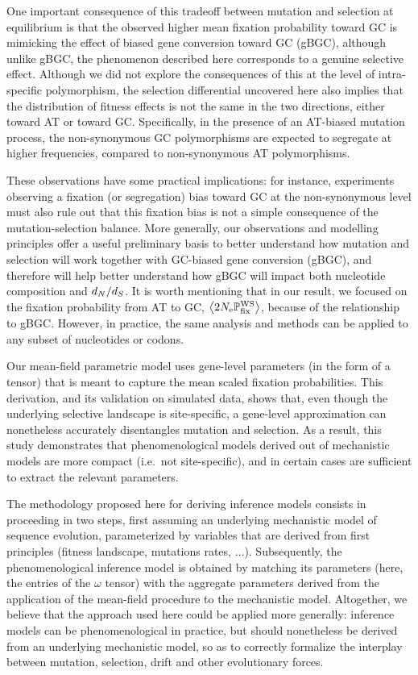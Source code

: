 \documentclass{article}
\begin{document}
One important consequence of this tradeoff between mutation and selection at equilibrium is that the observed higher mean fixation probability toward GC is mimicking the effect of biased gene conversion toward GC ({gBGC}), although unlike {gBGC}, the phenomenon described here corresponds to a genuine selective effect.
Although we did not explore the consequences of this at the level of intra-specific polymorphism, the selection differential uncovered here also implies that the distribution of fitness effects is not the same in the two directions, either toward AT or toward GC.
Specifically, in the presence of an AT-biased mutation process, the {non-synonymous} GC polymorphisms are expected to segregate at higher frequencies, compared to {non-synonymous} AT polymorphisms.

These observations have some practical implications: for instance, experiments observing a fixation (or segregation) bias toward GC at the {non-synonymous} level must also rule out that this fixation bias is not a simple consequence of the mutation-selection balance.
More generally, our observations and modelling principles offer a useful preliminary basis to better understand how mutation and selection will work together with GC-biased gene conversion ({gBGC}), and therefore will help better understand how {gBGC} will impact both nucleotide composition and $d_N / d_S$.
It is worth mentioning that in our result, we focused on the fixation probability from AT to GC, $\left\langle 2 N_{\text{e}} \mathbb{P}_{\text{fix}}^{\text{WS}} \right\rangle$, because of the relationship to {gBGC}.
However, in practice, the same analysis and methods can be applied to any subset of nucleotides or codons.

Our mean-field parametric model uses gene-level parameters (in the form of a tensor) that is meant to capture the mean scaled fixation probabilities.
This derivation, and its validation on simulated data, shows that, even though the underlying selective landscape is site-specific, a gene-level approximation can nonetheless accurately disentangles mutation and selection.
As a result, this study demonstrates that phenomenological models derived out of mechanistic models are more compact (i.e.~not site-specific), and in certain cases are sufficient to extract the relevant parameters.

The methodology proposed here for deriving inference models consists in proceeding in two steps, first assuming an underlying mechanistic model of sequence evolution, parameterized by variables that are derived from first principles (fitness landscape, mutations rates, $\hdots$).
Subsequently, the phenomenological inference model is obtained by matching its parameters (here, the entries of the $\omega$ tensor) with the aggregate parameters derived from the application of the mean-field procedure to the mechanistic model.
Altogether, we believe that the approach used here could be applied more generally: inference models can be phenomenological in practice, but should nonetheless be derived from an underlying mechanistic model, so as to correctly formalize the interplay between mutation, selection, drift and other evolutionary forces.
\end{document}
